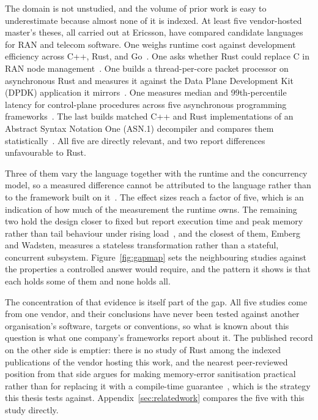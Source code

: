 \documentclass[english,oneside,a4paper,censored,csm,software-track-2020]{HYthesisML}
\begin{document}
The domain is not unstudied, and the volume of prior work is easy to underestimate because
almost none of it is indexed. At least five vendor-hosted master's theses, all carried out at
Ericsson, have compared candidate languages for RAN and telecom software. One weighs runtime
cost against development efficiency across C++, Rust, and Go~\cite{karlback2021ran}. One asks
whether Rust could replace C in RAN node management~\cite{olsson2023ranmgmt}. One builds a
thread-per-core packet processor on asynchronous Rust and measures it against the Data Plane
Development Kit (DPDK) application it mirrors~\cite{olsson2023asyncpackets}. One measures median and 99th-percentile
latency for control-plane procedures across five asynchronous programming
frameworks~\cite{arvidsson2025async}. The last builds matched C++ and Rust implementations of an
Abstract Syntax Notation One (ASN.1) decompiler and compares them
statistically~\cite{emberg2023asn1}. All five are directly
relevant, and two report differences unfavourable to Rust.

Three of them vary the language together with the runtime and the concurrency model, so a
measured difference cannot be attributed to the language rather than to the framework built on
it~\cite{karlback2021ran,olsson2023asyncpackets,arvidsson2025async}. The effect sizes reach a
factor of five, which is an indication of how much of the measurement the runtime owns. The
remaining two hold the design closer to fixed but report execution time and peak memory rather
than tail behaviour under rising load~\cite{olsson2023ranmgmt,emberg2023asn1}, and the closest
of them, Emberg and Wadsten, measures a stateless transformation rather than a stateful,
concurrent subsystem. Figure~\ref{fig:gapmap} sets the neighbouring studies against the
properties a controlled answer would require, and the pattern it shows is that each holds some
of them and none holds all.

The concentration of that evidence is itself part of the gap. All five studies come from one
vendor, and their conclusions have never been tested against another organisation's software,
targets or conventions, so what is known about this question is what one company's frameworks
report about it. The published record on the other side is emptier: there is no study of Rust
among the indexed publications of the vendor hosting this work, and the nearest peer-reviewed
position from that side argues for making memory-error sanitisation practical rather than for
replacing it with a compile-time guarantee~\cite{gjomemo2016mesc}, which is the strategy this
thesis tests against. Appendix~\ref{sec:relatedwork} compares the five with this study directly.
\end{document}
